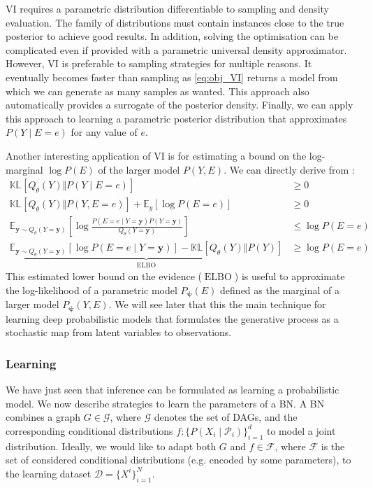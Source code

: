 VI requires a parametric distribution differentiable to sampling and density evaluation. The family of distributions must contain instances close to the true posterior to achieve good results. In addition, solving the optimisation can be complicated even if provided with a parametric universal density approximator. However, VI is preferable to sampling strategies for multiple reasons. It eventually becomes faster than sampling as \ref{eq:obj_VI} returns a model from which we can generate as many samples as wanted. This approach also automatically provides a surrogate of the posterior density. Finally, we can apply this approach to learning a parametric posterior distribution that approximates $P(Y\mid E=e)$ for any value of $e$.

Another interesting application of VI is for estimating a bound on the log-marginal $\log P(E)$ of the larger model $P(Y, E)$. We can directly derive from :
\begin{align}
  \mathbb{KL}\left[Q_\theta(Y)\Vert P(Y\mid E=e)\right] &\geq 0\\
  \mathbb{KL}\left[Q_\theta(Y)\Vert P(Y, E=e) \right] + \mathbb{E}_{y}\left[\log P(E=e)\right] &\geq 0\\
  \mathbb{E}_{\bm y \sim Q_\theta(Y=\bm{y})}\left[ \log \frac{P(E=e\mid Y=\bm{y}) P(Y=\bm{y})}{Q_\theta(Y=\bm{y})} \right] &\leq \log P(E=e)\\
  \underbrace{\mathbb{E}_{\bm y \sim Q_\theta(Y=\bm{y})}\left[ \log P(E=e\mid Y=\bm{y})\right] - \mathbb{KL}\left[Q_\theta(Y)\Vert P(Y)\right]}_{\operatorname{ELBO}} &\geq \log P(E=e) \label{eq:elbo}
\end{align}
This estimated lower bound on the evidence ($\operatorname{ELBO}$) is useful to approximate the log-likelihood of a parametric model $P_{\bm \psi}(E)$ defined as the marginal of a larger model $P_{\bm \psi}(Y, E)$.
We will see later that this the main technique for learning deep probabilistic models that formulates the generative process as a stochastic map from latent variables to observations.
\subsubsection{Learning}
We have just seen that inference can be formulated as learning a probabilistic model. We now describe strategies to learn the parameters of a BN.
A BN combines a graph $G \in \mathcal{G}$, where $\mathcal{G}$ denotes the set of DAGs, and the corresponding conditional distributions $f: \{P(X_i\mid \mathcal{P}_i)\}_{i=1}^d$ to model a joint distribution. Ideally, we would like to adapt both $G$ and $f \in \mathcal{F}$, where $\mathcal{F}$ is the set of considered conditional distributions (e.g. encoded by some parameters), to the learning dataset $\mathcal{D}=\{X^i\}_{i=1}^N$.

